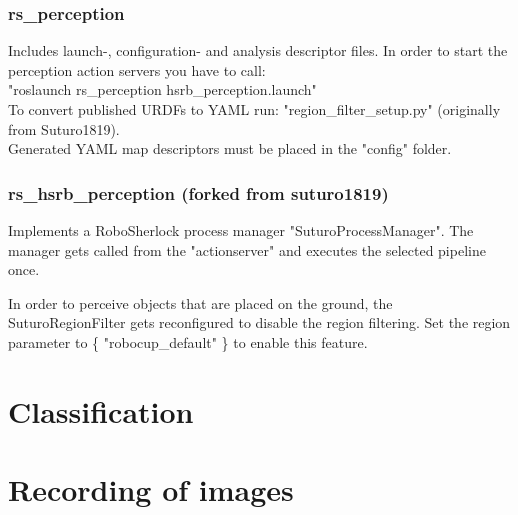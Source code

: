 \documentclass[main.tex]{subfiles}
\begin{document}
			\subsubsection{rs\_perception}
			Includes launch-, configuration- and analysis descriptor files.
			In order to start the perception action servers you have to call:\\
			"roslaunch rs\_perception hsrb\_perception.launch"\\
			To convert published URDFs to YAML run: "region\_filter\_setup.py" (originally from Suturo1819).\\
			Generated YAML map descriptors must be placed in the "config" folder.

			\subsubsection{rs\_hsrb\_perception (forked from suturo1819)}
			Implements a RoboSherlock process manager "SuturoProcessManager".
			The manager gets called from the "actionserver" and executes the selected pipeline once.
			
			In order to perceive objects that are placed on the ground, the SuturoRegionFilter gets reconfigured
			to disable the region filtering. Set the region parameter to \{ "robocup\_default" \} to enable this feature.

		\section{Classification}
		
		\section{Recording of images}  
\end{document}
